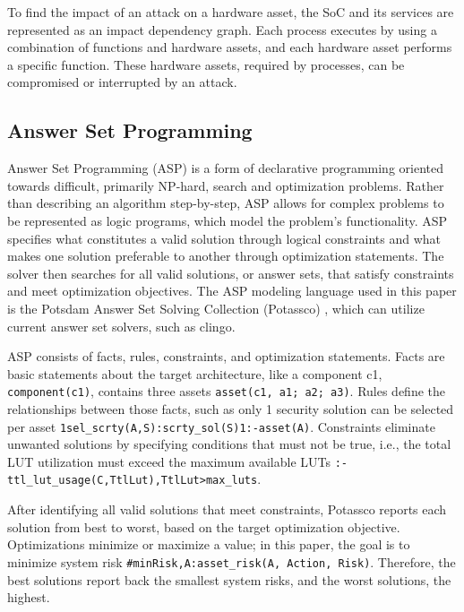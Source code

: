 To find the impact of an attack on a hardware asset, the SoC and its services are represented as an impact dependency graph. Each process executes by using a combination of functions and hardware assets, and each hardware asset performs a specific function. These hardware assets, required by processes, can be compromised or interrupted by an attack.


\subsection{Answer Set Programming}
Answer Set Programming (ASP) \cite{lifschitz02answerset} is a form of declarative programming oriented towards difficult, primarily NP-hard, search and optimization problems. Rather than describing an algorithm step-by-step, ASP allows for complex problems to be represented as logic programs, which model the problem's functionality. 
ASP specifies what constitutes a valid solution through logical constraints and what makes one solution preferable to another through optimization statements. The solver then searches for all valid solutions, or answer sets, that satisfy constraints and meet optimization objectives. 
The ASP modeling language used in this paper is the Potsdam Answer Set Solving Collection (Potassco) \cite{gebser_potassco_2011}, which can utilize current answer set solvers, such as clingo. 

ASP consists of facts, rules, constraints, and optimization statements. Facts are basic statements about the target architecture, like a component c1, \texttt{component(c1)}, contains three assets \texttt{asset(c1, a1; a2; a3)}. Rules define the relationships between those facts, such as only 1 security solution can be selected per asset \texttt{1{sel_scrty(A,S):scrty_sol(S)}1:-asset(A)}.
Constraints eliminate unwanted solutions by specifying conditions that must not be true, i.e., the total LUT utilization must exceed the maximum available LUTs \texttt{:- ttl_lut_usage(C,TtlLut),TtlLut>max_luts}. 

After identifying all valid solutions that meet constraints, Potassco reports each solution from best to worst, based on the target optimization objective. Optimizations minimize or maximize a value; in this paper, the goal is to minimize system risk  \texttt{#min{Risk,A:asset_risk(A, Action, {Risk)}}}. Therefore, the best solutions report back the smallest system risks, and the worst solutions, the highest.

